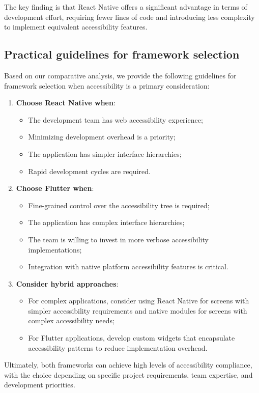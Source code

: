 The key finding is that React Native offers a significant advantage in terms of development effort, requiring fewer lines of code and introducing less complexity to implement equivalent accessibility features.

\subsection{Practical guidelines for framework selection}
\label{subsec:framework-selection}

Based on our comparative analysis, we provide the following guidelines for framework selection when accessibility is a primary consideration:

\begin{enumerate}
    \item \textbf{Choose React Native when}:
    \begin{itemize}
        \item The development team has web accessibility experience;
        \item Minimizing development overhead is a priority;
        \item The application has simpler interface hierarchies;
        \item Rapid development cycles are required.
    \end{itemize}
    
    \item \textbf{Choose Flutter when}:
    \begin{itemize}
        \item Fine-grained control over the accessibility tree is required;
        \item The application has complex interface hierarchies;
        \item The team is willing to invest in more verbose accessibility implementations;
        \item Integration with native platform accessibility features is critical.
    \end{itemize}
    
    \item \textbf{Consider hybrid approaches}:
    \begin{itemize}
        \item For complex applications, consider using React Native for screens with simpler accessibility requirements and native modules for screens with complex accessibility needs;
        \item For Flutter applications, develop custom widgets that encapsulate accessibility patterns to reduce implementation overhead.
    \end{itemize}
\end{enumerate}

Ultimately, both frameworks can achieve high levels of accessibility compliance, with the choice depending on specific project requirements, team expertise, and development priorities.